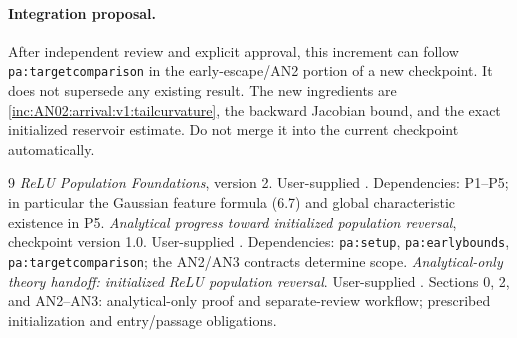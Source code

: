 \documentclass[11pt]{article}
\numberwithin{equation}{section}
\theoremstyle{remark}
\begin{document}
\paragraph{Integration proposal.}
After independent review and explicit approval, this increment can follow
\texttt{pa:targetcomparison} in the early-escape/AN2 portion of a new
checkpoint. It does not supersede any existing result. The new ingredients
are \eqref{inc:AN02:arrival:v1:tailcurvature}, the backward Jacobian bound,
and the exact initialized reservoir estimate. Do not merge it into the
current checkpoint automatically.

\begin{thebibliography}{9}
\emph{ReLU Population Foundations}, version 2.
User-supplied .
Dependencies: P1--P5; in particular the Gaussian feature formula (6.7)
and global characteristic existence in P5.
\emph{Analytical progress toward initialized population reversal},
checkpoint version 1.0.
User-supplied .
Dependencies: \texttt{pa:setup}, \texttt{pa:earlybounds},
\texttt{pa:targetcomparison}; the AN2/AN3 contracts determine scope.
\emph{Analytical-only theory handoff: initialized ReLU population reversal}.
User-supplied .
Sections 0, 2, and AN2--AN3: analytical-only proof and separate-review
workflow; prescribed initialization and entry/passage obligations.
\end{thebibliography}
\end{document}
